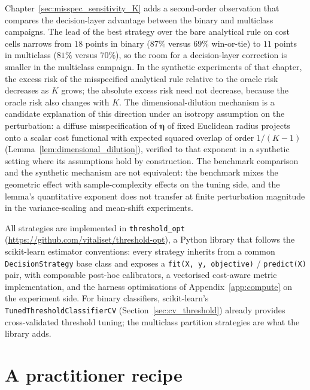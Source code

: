 Chapter~\ref{sec:misspec_sensitivity_K} adds a second-order observation that compares the decision-layer advantage between the binary and multiclass campaigns. The lead of the best strategy over the bare analytical rule on cost cells narrows from $18$ points in binary ($87\%$ versus $69\%$ win-or-tie) to $11$ points in multiclass ($81\%$ versus $70\%$), so the room for a decision-layer correction is smaller in the multiclass campaign. In the synthetic experiments of that chapter, the excess risk of the misspecified analytical rule relative to the oracle risk decreases as $K$ grows; the absolute excess risk need not decrease, because the oracle risk also changes with $K$. The dimensional-dilution mechanism is a candidate explanation of this direction under an isotropy assumption on the perturbation: a diffuse misspecification of $\boldsymbol{\eta}$ of fixed Euclidean radius projects onto a scalar cost functional with expected squared overlap of order $1/(K-1)$ (Lemma~\ref{lem:dimensional_dilution}), verified to that exponent in a synthetic setting where its assumptions hold by construction. The benchmark comparison and the synthetic mechanism are not equivalent: the benchmark mixes the geometric effect with sample-complexity effects on the tuning side, and the lemma's quantitative exponent does not transfer at finite perturbation magnitude in the variance-scaling and mean-shift experiments.

All strategies are implemented in \texttt{threshold\_opt} (\url{https://github.com/vitaliset/threshold-opt}), a Python library that follows the scikit-learn \citep{pedregosa2011scikit} estimator conventions: every strategy inherits from a common \texttt{DecisionStrategy} base class and exposes a \texttt{fit(X, y, objective)} / \texttt{predict(X)} pair, with composable post-hoc calibrators, a vectorised cost-aware metric implementation, and the harness optimisations of Appendix~\ref{app:compute} on the experiment side. For binary classifiers, scikit-learn's \texttt{TunedThresholdClassifierCV} (Section~\ref{sec:cv_threshold}) already provides cross-validated threshold tuning; the multiclass partition strategies are what the library adds.

\section{A practitioner recipe}\label{sec:practitioner_recipe}

